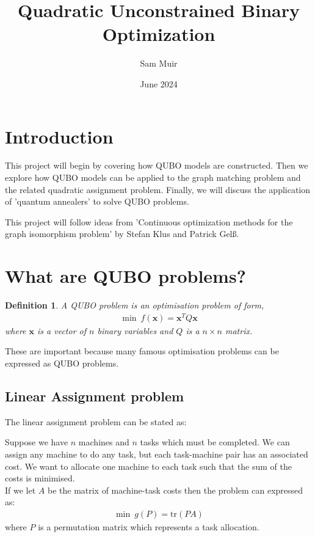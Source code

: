 \documentclass{article}
\title{Quadratic Unconstrained Binary Optimization}
\author{Sam Muir }
\date{June 2024}
\newtheorem{defn}[prop]{Definition}
\begin{document}
\maketitle

\section{Introduction}

This project will begin by covering how QUBO models are constructed. Then we explore how QUBO models can be applied to the graph matching problem and the related quadratic assignment problem. Finally, we will discuss the application of 'quantum annealers' to solve QUBO problems. 

This project will follow ideas from 'Continuous optimization methods for the graph isomorphism problem' by Stefan Klus and Patrick Gelß.

\section{What are QUBO problems?}
\begin{defn}
A QUBO problem is an optimisation problem of form, 
\begin{align*}
    \min \: f(\mathbf{x}) = \mathbf{x}^T Q \mathbf{x}
\end{align*}
where \(\mathbf{x}\) is a vector of \(n\) binary variables and \(Q\) is a \(n \times n\) matrix.
\end{defn}

\noindent These are important because many famous optimisation problems can be expressed as QUBO problems. 

\subsection{Linear Assignment problem}

The linear assignment problem can be stated as:

Suppose we have \(n\) machines and \(n\) tasks which must be completed. We can assign any machine to do any task, but each task-machine pair has an associated cost. We want to allocate one machine to each task such that the sum of the costs is minimised. \\

\noindent If we let \(A\) be the matrix of machine-task costs then the problem can expressed as: 
\begin{align*}
    \min \: g(P) = \text{tr}(PA)
\end{align*}
where \(P\) is a permutation matrix which represents a task allocation. \\
\end{document}
